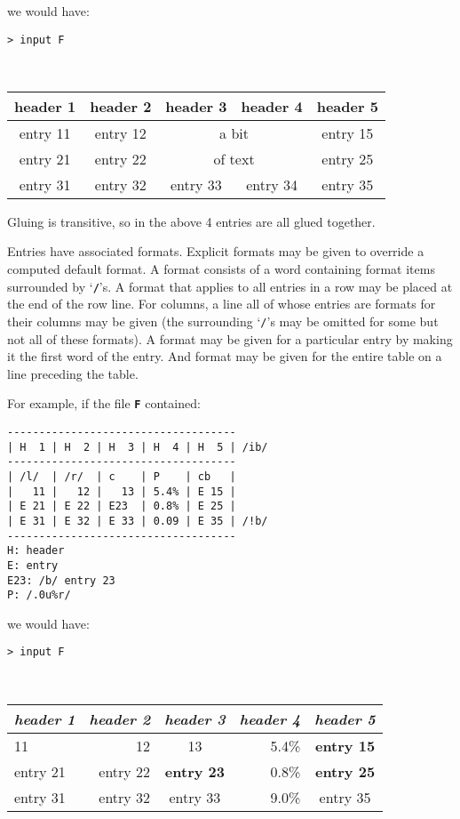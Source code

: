 \documentclass[12pt]{article}
\newcommand{\TT}[1]{{\tt \bfseries #1}}
\newenvironment{indpar}[1][0.3in]%
	{\begin{list}{}%
		     {\setlength{\itemsep}{0in}%
		      \setlength{\topsep}{0in}%
		      \setlength{\parsep}{1ex}%
		      \setlength{\labelwidth}{#1}%
		      \setlength{\leftmargin}{#1}%
		      \addtolength{\leftmargin}{\labelsep}}%
	 \item}%
	{\end{list}}
\begin{document}
we would have:

\verb|> input F| {\raggedright \\}
\begin{center}
\begin{tabular}{|c|c|c|c|c|}
\hline
\bf header 1 & \bf header 2 & \bf header 3 & \bf header 4 & \bf header 5 \\
\hline\hline
entry 11 & entry 12 & \multicolumn{2}{c|}{a bit} & entry 15 \\
\cline{1-2}\cline{5-5}
entry 21 & entry 22 & \multicolumn{2}{c|}{of text} & entry 25 \\
\hline
entry 31 & entry 32 & entry 33 & entry 34 & entry 35 \\
\hline
\end{tabular}
\end{center}

Gluing is transitive, so in the above 4 entries are all glued together.

Entries have associated formats.  Explicit formats may be given
to override a computed default format.  A format consists of a word
containing format items surrounded by `\TT{/}'s.
A format that applies to all entries in a row may be placed at the end
of the row line.  For columns, a line all of whose entries are formats
for their columns may be given (the surrounding `{\tt/}'s may be
omitted for some but not all of these formats).
A format may be given for a particular entry by making it the first
word of the entry.  And format may be given for the entire table
on a line preceding the table.

For example, if the file \TT{F} contained:
\begin{indpar}\begin{verbatim}
------------------------------------
| H  1 | H  2 | H  3 | H  4 | H  5 | /ib/
------------------------------------
| /l/  | /r/  | c    | P    | cb   |
|   11 |   12 |   13 | 5.4% | E 15 |
| E 21 | E 22 | E23  | 0.8% | E 25 |
| E 31 | E 32 | E 33 | 0.09 | E 35 | /!b/
------------------------------------
H: header
E: entry
E23: /b/ entry 23
P: /.0u%r/
\end{verbatim}\end{indpar}

we would have:

\verb|> input F| {\raggedright \\}
\begin{center}
\begin{tabular}{|l|r|c|r|c|}
\hline
\multicolumn{1}{|c|}{\bf \em header 1} &
\multicolumn{1}{|c|}{\bf \em header 2} &
\multicolumn{1}{|c|}{\bf \em header 3} &
\multicolumn{1}{|c|}{\bf \em header 4} &
\multicolumn{1}{|c|}{\bf \em header 5} \\
\hline
      11 &       12 &       13 & 5.4\% & \bf entry 15 \\
entry 21 & entry 22 & \bf entry 23 & 0.8\% & \bf entry 25 \\
entry 31 & entry 32 & entry 33 & 9.0\% & entry 35 \\
\hline
\end{tabular}
\end{center}
\end{document}
